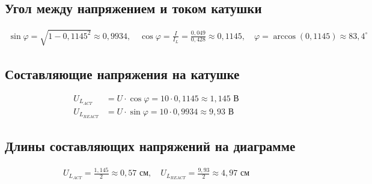 \documentclass[a4paper, 12pt]{article}
\begin{document}
\begin{enumerate}
    \subsection*{Угол между напряжением и током катушки}
    \begin{align*}
        \sin \varphi = \sqrt{1 - 0,1145^2} \approx 0,9934, \quad
        \cos \varphi = \frac{I}{I_L} = \frac{0,049}{0,428} \approx 0,1145, \quad
        \varphi = \arccos(0,1145) \approx 83,4^\circ
    \end{align*}
    \subsection*{Составляющие напряжения на катушке}
    \begin{align*}
        U_{L_{ACT}} &= U \cdot \cos \varphi = 10 \cdot 0,1145 \approx 1,145\text{ В} \\
        U_{L_{REACT}} &= U \cdot \sin \varphi = 10 \cdot 0,9934 \approx 9,93\text{ В}
    \end{align*}
    \subsection*{Длины составляющих напряжений на диаграмме}
    \begin{align*}
        U_{L_{ACT}} = \frac{1,145}{2} \approx 0,57\text{ см}, \quad
        U_{L_{REACT}} = \frac{9,93}{2} \approx 4,97\text{ см}
    \end{align*}

\end{enumerate}
\end{document}
